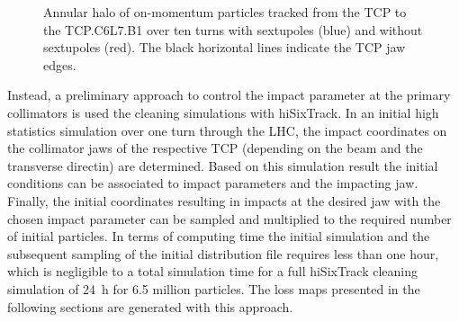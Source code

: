 \begin{figure}[htbp]
  \centering
  \caption{Annular halo of on-momentum particles tracked from the TCP to the TCP.C6L7.B1 over ten turns with sextupoles (blue) and without sextupoles (red). The black horizontal lines indicate the TCP jaw edges.}  
  \label{pic:16070603}
  \end{figure}

Instead, a preliminary approach to control the impact parameter at the primary collimators is used the cleaning simulations with hiSixTrack. In an initial high statistics simulation over one turn through the LHC, the impact coordinates on the collimator jaws of the respective TCP (depending on the beam and the transverse directin) are determined. Based on this simulation result the initial conditions can be associated to impact parameters and the impacting jaw. Finally, the initial coordinates resulting in impacts at the desired jaw with the chosen impact parameter can be sampled and multiplied to the required number of initial particles. In terms of computing time the initial simulation and the subsequent sampling of the initial distribution file requires less than one hour, which is negligible to a total simulation time for a full hiSixTrack cleaning simulation of 24~h for 6.5 million particles. The loss maps presented in the following sections are generated with this approach.

